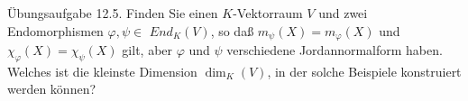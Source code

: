 \documentclass[10pt, letterpaper]{article}
\begin{document}
Übungsaufgabe 12.5. Finden Sie einen $K$-Vektorraum $V$ und zwei Endomorphismen $\varphi, \psi \in$ $E n d_{K}(V)$, so daß $m_{\psi}(X)=m_{\varphi}(X)$ und $\chi_{\varphi}(X)=\chi_{\psi}(X)$ gilt, aber $\varphi$ und $\psi$ verschiedene Jordannormalform haben. Welches ist die kleinste Dimension $\operatorname{dim}_{K}(V)$, in der solche Beispiele konstruiert werden können?
\end{document}
